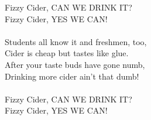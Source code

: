 
            Fizzy Cider, CAN WE DRINK IT? \\
            Fizzy Cider, YES WE CAN! \\
\hspace{10mm} \\
            Students all know it and freshmen, too, \\
            Cider is cheap but tastes like glue. \\
            After your taste buds have gone numb, \\
            Drinking more cider ain’t that dumb! \\
\hspace{10mm} \\
            Fizzy Cider, CAN WE DRINK IT? \\
            Fizzy Cider, YES WE CAN! \\
